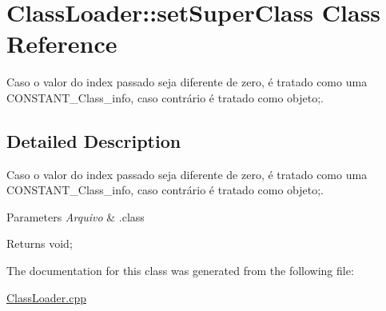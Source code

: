 \hypertarget{class_class_loader_1_1set_super_class}{}\section{Class\+Loader\+:\+:set\+Super\+Class Class Reference}
\label{class_class_loader_1_1set_super_class}


Caso o valor do index passado seja diferente de zero, é tratado como uma C\+O\+N\+S\+T\+A\+N\+T\+\_\+\+Class\+\_\+info, caso contrário é tratado como objeto;.  




\subsection{Detailed Description}
Caso o valor do index passado seja diferente de zero, é tratado como uma C\+O\+N\+S\+T\+A\+N\+T\+\_\+\+Class\+\_\+info, caso contrário é tratado como objeto;. 


\begin{DoxyParams}{Parameters}
{\em Arquivo} & .class \\
\hline
\end{DoxyParams}
\begin{DoxyReturn}{Returns}
void; 
\end{DoxyReturn}


The documentation for this class was generated from the following file\+:\begin{DoxyCompactItemize}
\item 
\hyperlink{_class_loader_8cpp}{Class\+Loader.\+cpp}\end{DoxyCompactItemize}
